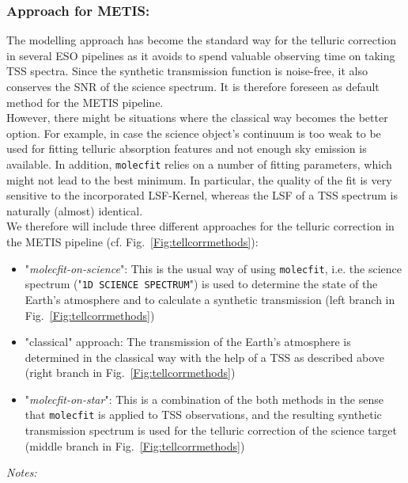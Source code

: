 \subsubsection{Approach for METIS:}
The modelling approach has become the standard way for the telluric correction in several ESO pipelines as it avoids to spend valuable observing time on taking \ac{TSS} spectra. Since the synthetic transmission function is noise-free, it also conserves the \ac{SNR} of the science spectrum. It is therefore  foreseen as default method for the \ac{METIS} pipeline.\\
However, there might be situations where the classical way becomes the better option. For example, in case the science object's continuum is too weak to be used for fitting telluric absorption features and not enough sky emission is available. In addition, \texttt{molecfit} relies on a number of fitting parameters, which might not lead to the best minimum. In particular, the quality of the fit is very sensitive to the incorporated \ac{LSF}-Kernel, whereas the \ac{LSF} of a \ac{TSS} spectrum is naturally (almost) identical.\\
We therefore will include three different approaches for the telluric correction in the \ac{METIS} pipeline (cf. Fig.~\ref{Fig:tellcorrmethods}):
\begin{itemize}
    \item "\textit{molecfit-on-science}": This is the usual way of using \texttt{molecfit}, i.e. the science spectrum ("\texttt{1D SCIENCE SPECTRUM}") is used to determine the state of the Earth's atmosphere and to calculate a synthetic transmission (left branch in Fig.~\ref{Fig:tellcorrmethods})
    \item "classical" approach: The transmission of the Earth's atmosphere is determined in the classical way with the help of a \ac{TSS} as described above (right branch in Fig.~\ref{Fig:tellcorrmethods})
    \item "\textit{molecfit-on-star}": This is a combination of the both methods in the sense that \texttt{molecfit} is applied to \ac{TSS} observations, and the resulting synthetic transmission spectrum is used for the telluric correction of the science target  (middle branch in Fig.~\ref{Fig:tellcorrmethods})
\end{itemize}
\textit{Notes:}\\
